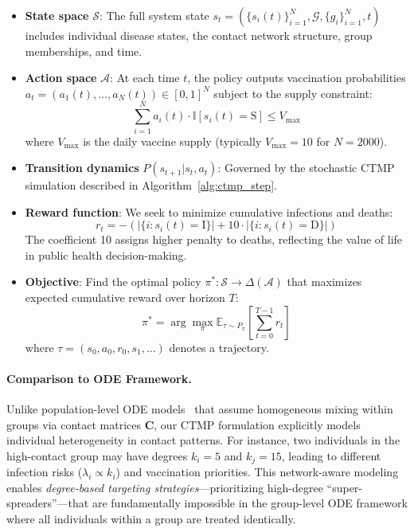 \begin{itemize}
    \item \textbf{State space} $\mathcal{S}$: The full system state $s_t = (\{s_i(t)\}_{i=1}^N, \mathcal{G}, \{g_i\}_{i=1}^N, t)$
    includes individual disease states, the contact network structure, group memberships, and time.

    \item \textbf{Action space} $\mathcal{A}$: At each time $t$, the policy outputs vaccination
    probabilities $a_t = (a_1(t), \ldots, a_N(t)) \in [0,1]^N$ subject to the supply constraint:
    \begin{equation}
    \sum_{i=1}^N a_i(t) \cdot \mathbb{I}[s_i(t) = \text{S}] \leq V_{\max}
    \label{eq:supply_constraint}
    \end{equation}
    where $V_{\max}$ is the daily vaccine supply (typically $V_{\max} = 10$ for $N=2000$).

    \item \textbf{Transition dynamics} $P(s_{t+1} | s_t, a_t)$: Governed by the stochastic
    CTMP simulation described in Algorithm~\ref{alg:ctmp_step}.

    \item \textbf{Reward function}: We seek to minimize cumulative infections and deaths:
    \begin{equation}
    r_t = -\left( |\{i : s_i(t) = \text{I}\}| + 10 \cdot |\{i : s_i(t) = \text{D}\}| \right)
    \label{eq:reward}
    \end{equation}
    The coefficient 10 assigns higher penalty to deaths, reflecting the value of life in
    public health decision-making.

    \item \textbf{Objective}: Find the optimal policy $\pi^*: \mathcal{S} \to \Delta(\mathcal{A})$
    that maximizes expected cumulative reward over horizon $T$:
    \begin{equation}
    \pi^* = \arg\max_{\pi} \mathbb{E}_{\tau \sim P_\pi} \left[ \sum_{t=0}^{T-1} r_t \right]
    \label{eq:objective}
    \end{equation}
    where $\tau = (s_0, a_0, r_0, s_1, \ldots)$ denotes a trajectory.
\end{itemize}

\paragraph{Comparison to ODE Framework.}
Unlike population-level ODE models~\citep{师兄论文} that assume homogeneous mixing within
groups via contact matrices $\mathbf{C}$, our CTMP formulation explicitly models individual
heterogeneity in contact patterns. For instance, two individuals in the high-contact group
may have degrees $k_i = 5$ and $k_j = 15$, leading to different infection risks ($\lambda_i \propto k_i$)
and vaccination priorities. This network-aware modeling enables \emph{degree-based targeting strategies}---prioritizing
high-degree ``super-spreaders''---that are fundamentally impossible in the group-level ODE framework
where all individuals within a group are treated identically.

